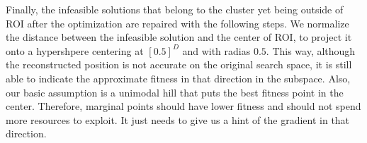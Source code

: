 Finally, the infeasible solutions that belong to the cluster yet being outside of ROI after the optimization are repaired with the following steps.
We normalize the distance between the infeasible solution and the center of ROI,
to project it onto a hypershpere centering at $[0.5]^D$ and with radias $0.5$.
This way, although the reconstructed position is not accurate on the original search space,
it is still able to indicate the approximate fitness in that direction in the subspace.
Also, our basic assumption is a unimodal hill that puts the best fitness point in the center.
Therefore, marginal points should have lower fitness and should not spend more resources to exploit.
It just needs to give us a hint of the gradient in that direction.


